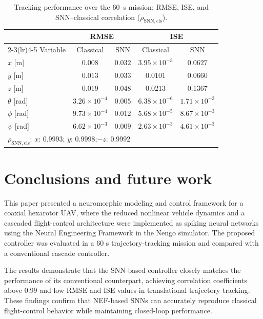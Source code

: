 \documentclass[conference]{IEEEtran}
\begin{document}
\begin{table}[h!]

\caption{Tracking performance over the $60$~s mission: RMSE, ISE, and SNN--classical correlation ($\rho_{\mathrm{SNN,cls}}$).}
\label{tab:benchmark}
\centering
\footnotesize
\setlength{\tabcolsep}{4.5pt}
\begin{tabular}{lcccc}
\toprule
 & \multicolumn{2}{c}{RMSE} & \multicolumn{2}{c}{ISE} \\
\cmidrule(lr){2-3}\cmidrule(lr){4-5}
Variable & Classical & SNN & Classical & SNN \\
\midrule
$x$ [m]        & $0.008$ & $0.032$ & $3.95 \times 10^{-3}$ & $0.0627$ \\
$y$ [m]        & $0.013$ & $0.033$ & $0.0101$ & $0.0660$ \\
$z$ [m]       & $0.019$ & $0.048$ & $0.0213$ & $0.1367$ \\
$\theta$ [rad] & $3 . 26 \times 10^{-4}$ & $0.005$ & $6.38 \times 10^{-6}$ & $1 . 71 \times 10^{-3}$ \\
$\phi$ [rad]   & $9 . 73 \times 10^ {-4}$ & $0.012$ & $5.68 \times 10^{-5}$ & $8 . 67 \times 10^{-3}$ \\
$\psi$ [rad]   & $6 . 62 \times 10 ^{-3}$ & $0.009$ & $2.63 \times 10^{-3}$ & $4 . 61 \times 10^{-3}$ \\
\midrule
\multicolumn{5}{l}{$\rho_{\mathrm{SNN,cls}}$:\; $x$: $0.9993$;\quad
$y$: $0.9998$;\quad $-z$: $0.9992$}\\
\bottomrule
\end{tabular}
\end{table}

\section{Conclusions and future work}\label{Conclusions}
This paper presented a neuromorphic modeling and control framework for a coaxial hexarotor UAV, where the reduced nonlinear vehicle dynamics and a cascaded flight-control architecture were implemented as spiking neural networks using the Neural Engineering Framework in the Nengo simulator. The proposed controller was evaluated in a 60 s trajectory-tracking mission and compared with a conventional cascade controller.

The results demonstrate that the SNN-based controller closely matches the performance of its conventional counterpart, achieving correlation coefficients above 0.99 and low RMSE and ISE values in translational trajectory tracking. These findings confirm that NEF-based SNNs can accurately reproduce classical flight-control behavior while maintaining closed-loop performance.
\end{document}
